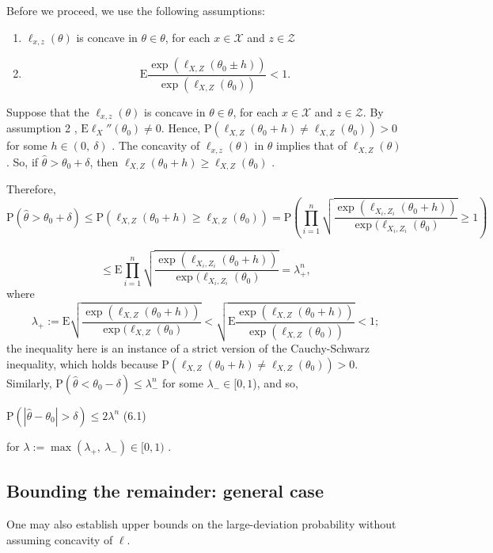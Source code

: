 Before we proceed, we use the following assumptions:

\begin{enumerate}
	\item $\ell_{x,z}(\theta)$ is concave in $\theta\in\theta$, for each $x\in \mathcal{X}$ and $z\in \mathcal{Z}$
	\item $$
	\mathrm{E}\frac{\exp(\ell_{X,Z}(\theta_{0}\pm h))}{\exp(\ell_{X,Z}(\theta_{0}))} < 1.$$
\end{enumerate}

Suppose that the $\ell_{x,z}(\theta)$ is concave in $\theta\in\theta$, for each $x\in \mathcal{X}$ and $z\in \mathcal{Z}$. By assumption 2 , $\mathrm{E}\ell_{X}''(\theta_{0})\neq 0$. Hence, $\mathrm{P}(\ell_{X,Z}(\theta_{0}+h)\neq\ell_{X,Z}(\theta_{0}))>0$ for some $h\in(0,\ \delta)$ . The concavity of $\ell_{x,z}(\theta)$ in $\theta$ implies that of $\ell_{X,Z}(\theta)$ . So, if $\hat{\theta}>\theta_{0}+\delta$, then $\ell_{X,Z}(\theta_{0}+h)\geq\ell_{X,Z}(\theta_{0})$ .

Therefore,
$$
\mathrm{P}(\hat{\theta}>\theta_{0}+\delta)\leq \mathrm{P}(\ell_{X,Z}(\theta_{0}+h)\geq\ell_{X,Z}(\theta_{0}))=\mathrm{P}(\prod_{i=1}^{n}\sqrt{\frac{\exp(\ell_{X_i,Z_i}(\theta_{0}+h))}{\exp(\ell_{X_i,Z_i}(\theta_{0})}}\geq 1)
$$

$$
\leq \mathrm{E}\prod_{i=1}^{n}\sqrt{\frac{\exp(\ell_{X_i,Z_i}(\theta_{0}+h))}{\exp(\ell_{X_i,Z_i}(\theta_{0})}}=\lambda_{+}^{n},
$$
where
$$
\lambda_{+}:=\mathrm{E}\sqrt{\frac{\exp(\ell_{X,Z}(\theta_{0}+h))}{\exp(\ell_{X,Z}(\theta_{0})}}<\sqrt{\mathrm{E}\frac{\exp(\ell_{X,Z}(\theta_{0}+h))}{\exp(\ell_{X,Z}(\theta_{0}))}} < 1;$$
the inequality here is an instance of a strict version of the Cauchy-Schwarz inequality, which holds because $\mathrm{P}(\ell_{X,Z}(\theta_{0}+h)\neq\ell_{X,Z}(\theta_{0}))>0$. Similarly, $\mathrm{P}(\hat{\theta}<\theta_{0}-\delta)\leq\lambda_{-}^{n}$ for some $\lambda_{-}\in[0,1$), and so,
\begin{center}
	$\mathrm{P}(|\hat{\theta}-\theta_{0}|>\delta)\leq 2\lambda^{n}$   (6.1)
\end{center}
for $\lambda :=\displaystyle \max(\lambda_{+},\ \lambda_{-})\in[0,1)$ .

\subsection*{Bounding the remainder: general case}
One may also establish upper bounds on the large-deviation probability without assuming concavity of $\ell$.